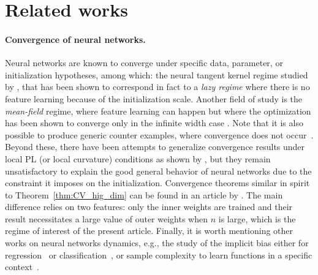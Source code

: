 \section{Related works}
\label{section:related_works}
\paragraph{Convergence of neural networks.} Neural networks are known to converge under specific data, parameter, or initialization hypotheses, among which: the neural tangent kernel regime studied by \citet{jacot2018neural,arora2019fine,du2018gradient,allen2019convergence}, that has been shown to correspond in fact to a \textit{lazy regime} where there is no feature learning because of the initialization scale. Another field of study is the \textit{mean-field} regime, where feature learning can happen but where the optimization has been shown to converge only in the infinite width case \citep{mei2018mean,chizat2018global,rotskoff2018parameters}. Note that it is also possible to produce generic counter examples, where convergence does not occur~\citep{boursier2024simplicitybiasoptimizationthreshold}. Beyond these, there have been attempts to generalize convergence results under local PL (or local curvature) conditions as shown by \citet{chatterjee2022convergence,liu2022loss,zhou2021local}, but they remain unsatisfactory to explain the good general behavior of neural networks due to the constraint it imposes on the initialization. Convergence theorems similar in spirit to Theorem~\ref{thm:CV_hig_dim} can be found in an article by \citet{chen2022feature}. The main difference relies on two features: only the inner weights are trained and their result necessitates a large value of outer weights when $n$ is large, which is the regime of interest of the present article. Finally, it is worth mentioning other works on neural networks dynamics, e.g., the study of the implicit bias either for regression~\citep{boursier2022gradient} or classification~\citep{Lyu2020Gradient,ji2020directional}, or sample complexity to learn functions in a specific context~\citep{glasgow2023sgd}.


